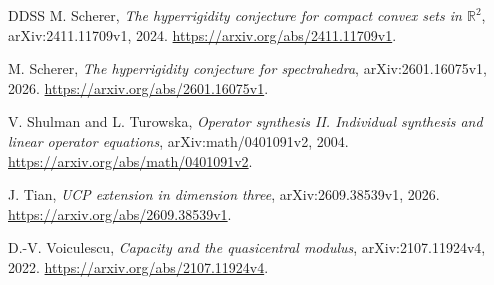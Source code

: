 \documentclass[11pt,letterpaper]{amsart}
\theoremstyle{definition}
\theoremstyle{remark}
\numberwithin{equation}{section}
\newcommand{\R}{\mathbb R}
\begin{document}
\begin{thebibliography}{DDSS}
M. Scherer, \emph{The hyperrigidity conjecture for compact convex sets
in $\R^2$}, arXiv:2411.11709v1, 2024.
\url{https://arxiv.org/abs/2411.11709v1}.

M. Scherer, \emph{The hyperrigidity conjecture for spectrahedra},
arXiv:2601.16075v1, 2026.
\url{https://arxiv.org/abs/2601.16075v1}.

V. Shulman and L. Turowska, \emph{Operator synthesis II. Individual
synthesis and linear operator equations}, arXiv:math/0401091v2, 2004.
\url{https://arxiv.org/abs/math/0401091v2}.

J. Tian, \emph{UCP extension in dimension three},
arXiv:2609.38539v1, 2026.
\url{https://arxiv.org/abs/2609.38539v1}.

D.-V. Voiculescu, \emph{Capacity and the quasicentral modulus},
arXiv:2107.11924v4, 2022.
\url{https://arxiv.org/abs/2107.11924v4}.
\end{thebibliography}
\end{document}
